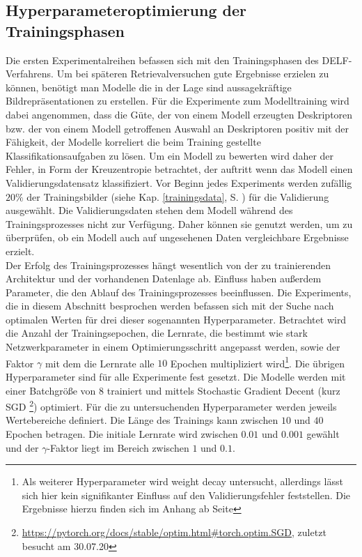 \subsection{Hyperparameteroptimierung der Trainingsphasen}\label{hyperparam}
Die ersten Experimentalreihen befassen sich mit den Trainingsphasen des DELF-Verfahrens. Um bei späteren Retrievalversuchen gute Ergebnisse erzielen zu können, benötigt man Modelle die in der Lage sind aussagekräftige Bildrepräsentationen zu erstellen. Für die Experimente zum Modelltraining wird dabei angenommen, dass die Güte, der von einem Modell erzeugten Deskriptoren bzw. der von einem Modell getroffenen Auswahl an Deskriptoren positiv mit der Fähigkeit, der Modelle korreliert die beim Training gestellte Klassifikationsaufgaben zu lösen. Um ein Modell zu bewerten wird daher der Fehler, in Form der Kreuzentropie betrachtet, der auftritt wenn das Modell einen Validierungsdatensatz klassifiziert. Vor Beginn jedes Experiments werden zufällig $20\%$ der Trainingsbilder (siehe Kap. \ref{trainingsdata}, S. \pageref{trainingsdata}) für die Validierung ausgewählt. Die Validierungsdaten stehen dem Modell während des Trainingsprozesses nicht zur Verfügung. Daher können sie genutzt werden, um zu überprüfen, ob ein Modell auch auf ungesehenen Daten vergleichbare Ergebnisse erzielt.
\\
Der Erfolg des Trainingsprozesses hängt wesentlich von der zu trainierenden Architektur und der vorhandenen Datenlage ab. Einfluss haben außerdem Parameter, die den Ablauf des Trainingsprozesses beeinflussen. Die Experiments, die in diesem Abschnitt besprochen werden befassen sich mit der Suche nach optimalen Werten für drei dieser sogenannten Hyperparameter. Betrachtet wird die Anzahl der Trainingsepochen, die Lernrate, die bestimmt wie stark Netzwerkparameter in einem Optimierungsschritt angepasst werden, sowie der Faktor $\gamma$ mit dem die Lernrate alle $10$ Epochen multipliziert wird\footnote{Als weiterer Hyperparameter wird weight decay untersucht, allerdings lässt sich hier kein signifikanter Einfluss auf den Validierungsfehler feststellen. Die Ergebnisse hierzu finden sich im Anhang ab Seite \pageref{weight_decay}}. Die übrigen Hyperparameter sind für alle Experimente fest gesetzt. Die Modelle werden mit einer Batchgröße von $8$ trainiert und mittels Stochastic Gradient Decent (kurz SGD \footnote{\url{https://pytorch.org/docs/stable/optim.html\#torch.optim.SGD}, zuletzt besucht am 30.07.20}) optimiert. Für die zu untersuchenden Hyperparameter werden jeweils Wertebereiche definiert. Die Länge des Trainings kann zwischen $10$ und $40$ Epochen betragen. Die initiale Lernrate wird zwischen $0.01$ und $0.001$ gewählt und der $\gamma$-Faktor liegt im Bereich zwischen $1$ und $0.1$.
